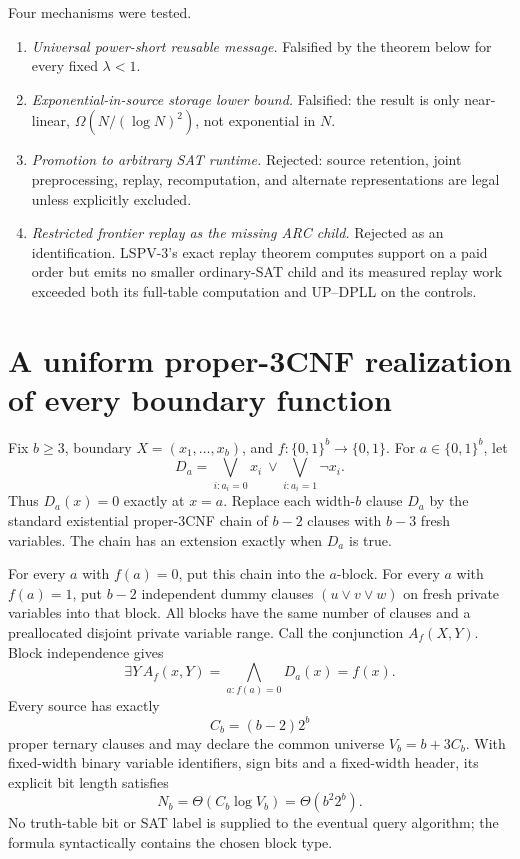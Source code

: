 \documentclass[11pt]{article}
\begin{document}
Four mechanisms were tested.
\begin{enumerate}
\item \emph{Universal power-short reusable message.}  Falsified by the theorem
below for every fixed $\lambda<1$.
\item \emph{Exponential-in-source storage lower bound.}  Falsified: the result
is only near-linear, $\Omega(N/(\log N)^2)$, not exponential in $N$.
\item \emph{Promotion to arbitrary SAT runtime.}  Rejected: source retention,
joint preprocessing, replay, recomputation, and alternate representations are
legal unless explicitly excluded.
\item \emph{Restricted frontier replay as the missing ARC child.}  Rejected as
an identification.  LSPV-3's exact replay theorem computes support on a paid
order but emits no smaller ordinary-SAT child and its measured replay work
exceeded both its full-table computation and UP--DPLL on the controls.
\end{enumerate}

\section{A uniform proper-3CNF realization of every boundary function}
Fix $b\ge3$, boundary $X=(x_1,\ldots,x_b)$, and
$f:\{0,1\}^b\to\{0,1\}$.  For $a\in\{0,1\}^b$, let
\[
 D_a=\bigvee_{i:a_i=0}x_i\ \vee\!
     \bigvee_{i:a_i=1}\neg x_i.
\]
Thus $D_a(x)=0$ exactly at $x=a$.  Replace each width-$b$ clause $D_a$ by the
standard existential proper-3CNF chain of $b-2$ clauses with $b-3$ fresh
variables.  The chain has an extension exactly when $D_a$ is true.

For every $a$ with $f(a)=0$, put this chain into the $a$-block.  For every
$a$ with $f(a)=1$, put $b-2$ independent dummy clauses
$(u\vee v\vee w)$ on fresh private variables into that block.  All blocks have
the same number of clauses and a preallocated disjoint private variable range.
Call the conjunction $A_f(X,Y)$.  Block independence gives
\[
 \exists Y\,A_f(x,Y)=\bigwedge_{a:f(a)=0} D_a(x)=f(x).
\]
Every source has exactly
\[
 C_b=(b-2)2^b
\]
proper ternary clauses and may declare the common universe
$V_b=b+3C_b$.  With fixed-width binary variable identifiers, sign bits and a
fixed-width header, its explicit bit length satisfies
\[
 N_b=\Theta(C_b\log V_b)=\Theta(b^2 2^b).
\]
No truth-table bit or SAT label is supplied to the eventual query algorithm;
the formula syntactically contains the chosen block type.
\end{document}
